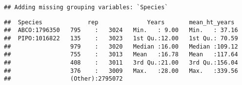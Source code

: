 \documentclass[]{article}
\begin{document}
\begin{verbatim}
## Adding missing grouping variables: `Species`
\end{verbatim}

\begin{verbatim}
##  Species             rep              Years       mean_ht_years   
##  ABCO:1796350   795    :   3024   Min.   : 9.00   Min.   : 37.16  
##  PIPO:1016822   135    :   3023   1st Qu.:12.00   1st Qu.: 70.59  
##                 979    :   3020   Median :16.00   Median :109.12  
##                 755    :   3013   Mean   :16.78   Mean   :117.64  
##                 408    :   3011   3rd Qu.:21.00   3rd Qu.:156.04  
##                 376    :   3009   Max.   :28.00   Max.   :339.56  
##                 (Other):2795072
\end{verbatim}
\end{document}

